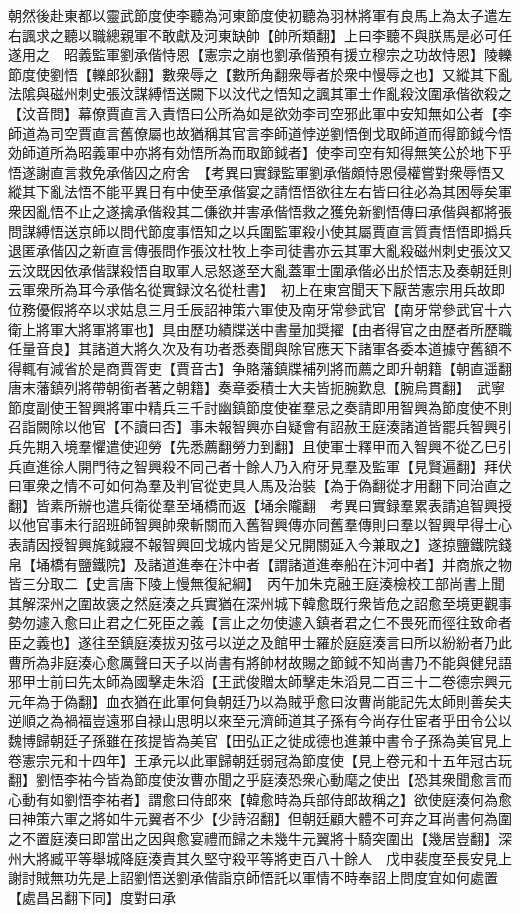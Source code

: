 朝然後赴東都以靈武節度使李聽為河東節度使初聽為羽林將軍有良馬上為太子遣左右諷求之聽以職總親軍不敢獻及河東缺帥【帥所類翻】上曰李聽不與朕馬是必可任遂用之　昭義監軍劉承偕恃恩【憲宗之崩也劉承偕預有援立穆宗之功故恃恩】陵轢節度使劉悟【轢郎狄翻】數衆辱之【數所角翻衆辱者於衆中慢辱之也】又縱其下亂法隂與磁州刺史張汶謀縛悟送闕下以汶代之悟知之諷其軍士作亂殺汶圍承偕欲殺之【汶音問】幕僚賈直言入責悟曰公所為如是欲効李司空邪此軍中安知無如公者【李師道為司空賈直言舊僚屬也故猶稱其官言李師道悖逆劉悟倒戈取師道而得節鉞今悟効師道所為昭義軍中亦將有効悟所為而取節鉞者】使李司空有知得無笑公於地下乎悟遂謝直言救免承偕囚之府舍　【考異曰實録監軍劉承偕頗恃恩侵權嘗對衆辱悟又縱其下亂法悟不能平異日有中使至承偕宴之請悟悟欲往左右皆曰往必為其困辱矣軍衆因亂悟不止之遂擒承偕殺其二傔欲并害承偕悟救之獲免新劉悟傳曰承偕與都將張問謀縛悟送京師以問代節度事悟知之以兵圍監軍殺小使其屬賈直言質責悟悟即撝兵退匿承偕囚之新直言傳張問作張汶杜牧上李司徒書亦云其軍大亂殺磁州刺史張汶又云汶既因依承偕謀殺悟自取軍人忌怒遂至大亂蓋軍士圍承偕必出於悟志及奏朝廷則云軍衆所為耳今承偕名從實録汶名從杜書】　初上在東宫聞天下厭苦憲宗用兵故即位務優假將卒以求姑息三月壬辰詔神策六軍使及南牙常參武官【南牙常參武官十六衛上將軍大將軍將軍也】具由歷功績牒送中書量加奨擢【由者得官之由歷者所歷職任量音良】其諸道大將久次及有功者悉奏聞與除官應天下諸軍各委本道據守舊額不得輒有減省於是商賈胥吏【賈音古】争賂藩鎮牒補列將而薦之即升朝籍【朝直遥翻唐末藩鎮列將帶朝銜者著之朝籍】奏章委積士大夫皆扼腕歎息【腕烏貫翻】　武寧節度副使王智興將軍中精兵三千討幽鎮節度使崔羣忌之奏請即用智興為節度使不則召詣闕除以他官【不讀曰否】事未報智興亦自疑會有詔赦王庭湊諸道皆罷兵智興引兵先期入境羣懼遣使迎勞【先悉薦翻勞力到翻】且使軍士釋甲而入智興不從乙巳引兵直進徐人開門待之智興殺不同己者十餘人乃入府牙見羣及監軍【見賢遍翻】拜伏曰軍衆之情不可如何為羣及判官從吏具人馬及治裝【為于偽翻從才用翻下同治直之翻】皆素所辦也遣兵衛從羣至埇橋而返【埇余隴翻　考異曰實録羣累表請追智興授以他官事未行詔班師智興帥衆斬關而入舊智興傳亦同舊羣傳則曰羣以智興早得士心表請因授智興旄鉞寢不報智興回戈城内皆是父兄開關延入今兼取之】遂掠鹽鐵院錢帛【埇橋有鹽鐵院】及諸道進奉在汴中者【謂諸道進奉船在汴河中者】并商旅之物皆三分取二【史言唐下陵上慢無復紀綱】　丙午加朱克融王庭湊檢校工部尚書上聞其解深州之圍故褒之然庭湊之兵實猶在深州城下韓愈既行衆皆危之詔愈至境更觀事勢勿遽入愈曰止君之仁死臣之義【言止之勿使遽入鎮者君之仁不畏死而徑往致命者臣之義也】遂往至鎮庭湊拔刃弦弓以逆之及館甲士羅於庭庭湊言曰所以紛紛者乃此曹所為非庭湊心愈厲聲曰天子以尚書有將帥材故賜之節鉞不知尚書乃不能與健兒語邪甲士前曰先太師為國擊走朱滔【王武俊贈太師擊走朱滔見二百三十二卷德宗興元元年為于偽翻】血衣猶在此軍何負朝廷乃以為賊乎愈曰汝曹尚能記先太師則善矣夫逆順之為禍福豈遠邪自禄山思明以來至元濟師道其子孫有今尚存仕宦者乎田令公以魏博歸朝廷子孫雖在孩提皆為美官【田弘正之徙成德也進兼中書令子孫為美官見上卷憲宗元和十四年】王承元以此軍歸朝廷弱冠為節度使【見上卷元和十五年冠古玩翻】劉悟李祐今皆為節度使汝曹亦聞之乎庭湊恐衆心動麾之使出【恐其衆聞愈言而心動有如劉悟李祐者】謂愈曰侍郎來【韓愈時為兵部侍郎故稱之】欲使庭湊何為愈曰神策六軍之將如牛元翼者不少【少詩沼翻】但朝廷顧大體不可弃之耳尚書何為圍之不置庭湊曰即當出之因與愈宴禮而歸之未幾牛元翼將十騎突圍出【幾居豈翻】深州大將臧平等舉城降庭湊責其久堅守殺平等將吏百八十餘人　戊申裴度至長安見上謝討賊無功先是上詔劉悟送劉承偕詣京師悟託以軍情不時奉詔上問度宜如何處置【處昌呂翻下同】度對曰承